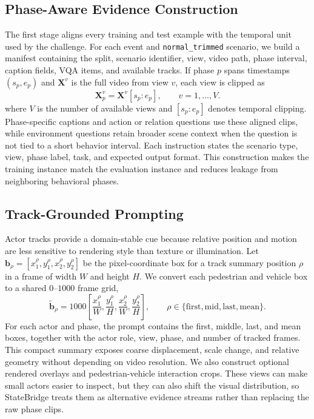 \documentclass[runningheads]{llncs}
\begin{document}
\subsection{Phase-Aware Evidence Construction}

The first stage aligns every training and test example with the temporal unit used by the challenge. For each event and \texttt{normal\_trimmed} scenario, we build a manifest containing the split, scenario identifier, view, video path, phase interval, caption fields, VQA items, and available tracks. If phase $p$ spans timestamps $(s_p,e_p)$ and $\mathbf{X}^{v}$ is the full video from view $v$, each view is clipped as
\begin{equation}
    \mathbf{X}_{p}^{v}
    =
    \mathbf{X}^{v}[s_p:e_p],
    \qquad v=1,\ldots,V .
    \label{eq:phase_clip}
\end{equation}
where $V$ is the number of available views and $[s_p:e_p]$ denotes temporal clipping. Phase-specific captions and action or relation questions use these aligned clips, while environment questions retain broader scene context when the question is not tied to a short behavior interval. Each instruction states the scenario type, view, phase label, task, and expected output format. This construction makes the training instance match the evaluation instance and reduces leakage from neighboring behavioral phases.

\subsection{Track-Grounded Prompting}

Actor tracks provide a domain-stable cue because relative position and motion are less sensitive to rendering style than texture or illumination. Let $\mathbf{b}_{\rho}=[x_{1}^{\rho},y_{1}^{\rho},x_{2}^{\rho},y_{2}^{\rho}]$ be the pixel-coordinate box for a track summary position $\rho$ in a frame of width $W$ and height $H$. We convert each pedestrian and vehicle box to a shared $0$--$1000$ frame grid,
\begin{equation}
    \widetilde{\mathbf{b}}_{\rho}
    =
    1000
    \left[
    \frac{x_{1}^{\rho}}{W},\frac{y_{1}^{\rho}}{H},
    \frac{x_{2}^{\rho}}{W},\frac{y_{2}^{\rho}}{H}
    \right],
    \qquad
    \rho\in\{\mathrm{first},\mathrm{mid},\mathrm{last},\mathrm{mean}\}.
    \label{eq:bbox}
\end{equation}
For each actor and phase, the prompt contains the first, middle, last, and mean boxes, together with the actor role, view, phase, and number of tracked frames. This compact summary exposes coarse displacement, scale change, and relative geometry without depending on video resolution. We also construct optional rendered overlays and pedestrian-vehicle interaction crops. These views can make small actors easier to inspect, but they can also shift the visual distribution, so StateBridge treats them as alternative evidence streams rather than replacing the raw phase clips.
\end{document}
